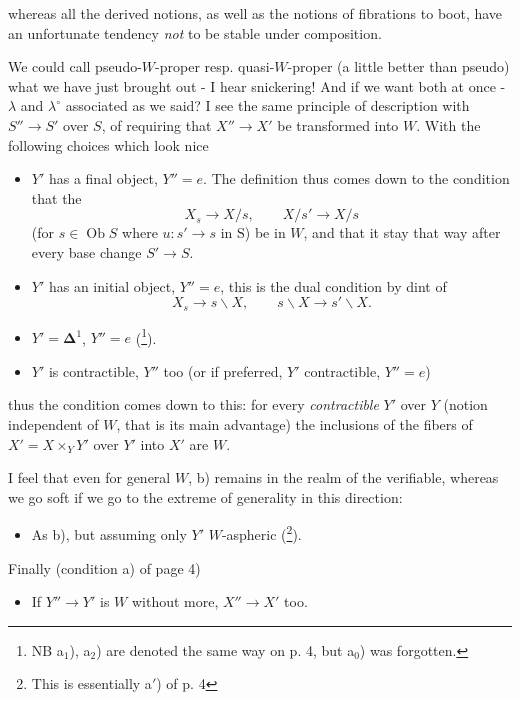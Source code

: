 \documentclass[11pt,leqno]{article}
\newcommand{\printedpage}[1]{\marginpar{\footnotesize p.~#1}}
\newcommand{\msp}[1]{\marginpar{\footnotesize [#1]}}
\newcommand{\fl}{\longrightarrow}
\newcommand{\Ob}{\operatorname{Ob}}
\begin{document}
\printedpage{29}
whereas all the derived notions, as well as the notions of fibrations to boot, have an unfortunate tendency \textit{not} to be stable under composition.

We could call pseudo-$W$-proper resp. quasi-$W$-proper (a little better than pseudo) what we have just brought out - I hear snickering! And if we want both at once - $\lambda$ and $\lambda^{\circ}$ associated as we said? I see the same principle of description with $S''\fl S'$ over $S$, of requiring that $X''\fl X'$ be transformed into $W$. With the following choices which look nice

\begin{itemize}
\item[a$_1$)] \msp{page 39}$Y'$ has a final object, $Y''=e$. The definition thus comes down to the condition that the
\[ X_s\fl X/s, \qquad X/s'\fl X/s \]
(for $s\in\Ob S$ where $u : s'\fl s$ in $\mathrm{S}$) be in $W$, and that it stay that way after every base change $S'\fl S$.

\item[a$_2$)] $Y'$ has an initial object, $Y''=e$, this is the dual condition by dint of
\[ X_s\fl s\backslash X, \qquad s\backslash X\fl s'\backslash X. \]

\item[a$_0$)] $Y'=\boldsymbol{\Delta}^1$, $Y''=e$ (\footnote[46]{NB a$_1$), a$_2$) are denoted the same way on p. 4, but a$_0$) was forgotten.}).

\item[b)] $Y'$ is contractible, $Y''$ too (or if preferred, $Y'$ contractible, $Y''=e$)
\end{itemize}

thus the condition comes down to this: for every \textit{contractible} $Y'$ over $Y$ (notion independent of $W$, that is its main advantage) the inclusions of the fibers of $X'=X\times_Y Y'$ over $Y'$ into $X'$ are $W$.

I feel that even for general $W$, b) remains in the realm of the verifiable, whereas we go soft if we go to the extreme of generality in this direction:

\begin{itemize}
\item[b$'$)] As b), but assuming only $Y'$ $W$-aspheric (\footnote[47]{This is essentially a$'$) of p. 4}).
\end{itemize}

Finally (condition a) of page 4)

\begin{itemize}
\item[c)] If $Y''\fl Y'$ is $W$ without more, $X''\fl X'$ too.
\end{itemize}
\end{document}
